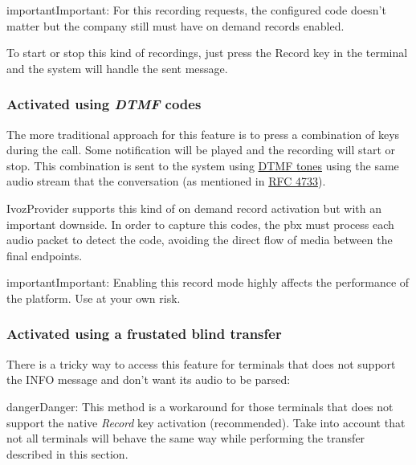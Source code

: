 \documentclass[letterpaper,10pt,english]{sphinxmanual}
\begin{document}
\begin{notice}{important}{Important:}
For this recording requests, the configured code doesn't matter
but the company still must have on demand records enabled.
\end{notice}

To start or stop this kind of recordings, just press the Record key in the
terminal and the system will handle the sent message.


\subsubsection{Activated using \emph{DTMF} codes}
\label{pbx_features/call_recording:activated-using-dtmf-codes}
The more traditional approach for this feature is to press a combination of
keys during the call. Some notification will be played and the recording will
start or stop. This combination is sent to the system using \href{https://es.wikipedia.org/wiki/Marcaci\%C3\%B3n\_por\_tonos}{DTMF tones} using the same audio
stream that the conversation (as mentioned in \href{https://tools.ietf.org/html/rfc4733}{RFC 4733}).

IvozProvider supports this kind of on demand record activation but with an
important downside. In order to capture this codes, the pbx must process each
audio packet to detect the code, avoiding the direct flow of media between the
final endpoints.

\begin{notice}{important}{Important:}
Enabling this record mode highly affects the performance of the
platform. Use at your own risk.
\end{notice}


\subsubsection{Activated using a frustated blind transfer}
\label{pbx_features/call_recording:activated-using-a-frustated-blind-transfer}
There is a tricky way to access this feature for terminals that does not support
the INFO message and don't want its audio to be parsed:

\begin{notice}{danger}{Danger:}
This method is a workaround for those terminals that does not support
the native \emph{Record} key activation (recommended). Take into account that not
all terminals will behave the same way while performing the transfer described
in this section.
\end{notice}
\end{document}
